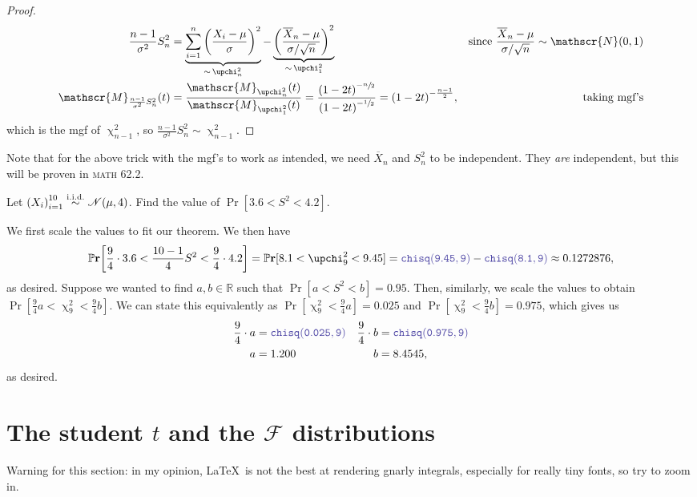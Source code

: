 \begin{proof}
\begin{align*}
        \frac{n-1}{\sigma^2} S_n^2 &= \underbrace{\sum_{i=1}^n {\bigg(\frac{X_i -\mu}{\sigma}\bigg)}^2}_{\sim\,\upchi_n^2}  -  \underbrace{{\bigg(\frac{\overline{X}_n -\mu}{\sigma/\sqrt{n}}\bigg)}^2}_{\sim\,\upchi_1^2} &\text{since}~\frac{\overline{X}_n - \mu}{\sigma/\sqrt{n}}\sim \mathscr{N}(0,1) \\ 
        \mathscr{M}_{\frac{n-1}{\sigma^2}S_n^2}(t) & = \frac{\mathscr{M}_{\upchi_n^2}(t)}{\mathscr{M}_{\upchi_1^2}(t)} = \frac{{(1-2t)}^{-\sfrac{n}{2}}}{{(1-2t)}^{-\sfrac{1}{2}}} = {(1-2t)}^{-\frac{n-1}{2}}, &\text{taking mgf's}
    \end{align*}which is the mgf of \(\upchi_{n-1}^2\), so \(\frac{n-1}{\sigma^2}S_n^2 \sim \upchi_{n-1}^2\). 
\end{proof}

Note that for the above trick with the mgf's to work as intended, we need \(\overline{X}_n\) and \(S_n^2\) to be independent. 
They \textit{are} independent, but this will be proven in \textsc{math} 62.2. 

\begin{example}
    Let \({(X_i)}_{i=1}^{10} \stackrel{\mathrm{i.i.d.}}{\sim} \mathscr{N}(\mu, 4)\). Find the value of \(\Pr[3.6 < S^2 <4.2]\). 

    We first scale the values to fit our theorem. We then have\[
    \Pr\bigg[\frac{9}{4} \cdot 3.6 < \frac{10-1}{4} S^2 < \frac{9}{4}\cdot 4.2\bigg] = \Pr[8.1 < \upchi_9^2 < 9.45] = \code{chisq(9.45,9)} - \code{chisq(8.1,9)} \approx 0.1272876,
    \]as desired. Suppose we wanted to find \(a,b\in\mathbb{R}\) such that \(\Pr[a<S^2<b] = 0.95\). 
    Then, similarly, we scale the values to obtain \(\Pr[\frac{9}{4} a < \upchi_9^2 <\frac{9}{4} b]\). 
    We can state this equivalently as \(\Pr[\upchi_9^2 < \frac{9}{4}a] = 0.025\) and \(\Pr[\upchi_9^2 < \frac{9}{4}b ] = 0.975\), which gives us\begin{align*}
        \frac{9}{4}\cdot a &= \code{chisq(0.025, 9)} & \frac{9}{4}\cdot b &= \code{chisq(0.975,9)} \\ 
        a & = 1.200 & b&= 8.4545,
    \end{align*}as desired. 
\end{example}

\section{The student \(t\) and the \(\mathscr{F}\) distributions}
Warning for this section: in my opinion, \LaTeX~is not the best at rendering gnarly integrals, especially for really tiny fonts, so try to zoom in. 

